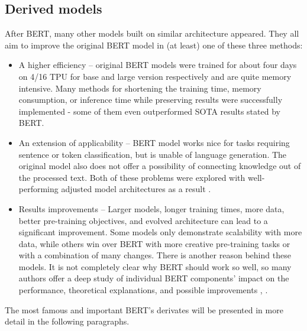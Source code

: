 \subsection{Derived models}
After BERT, many other models built on similar architecture appeared. They all aim to improve the original BERT model in (at least) one of these three methods:
\begin{itemize}
\item A higher efficiency -- original BERT models were trained for about four days on 4/16 TPU for base and large version respectively and are quite memory intensive. Many methods for shortening the training time, memory consumption, or inference time while preserving results were successfully implemented - some of them even outperformed SOTA results stated by BERT.
\item An extension of applicability -- BERT model works nice for tasks requiring sentence or token classification, but is unable of language generation. The original model also does not offer a possibility of connecting knowledge out of the processed text. Both of these problems were explored with well-performing adjusted model architectures as a result \citep{Zhang2019}.
\item Results improvements -- Larger models, longer training times, more data,  better pre-training objectives, and evolved architecture can lead to a significant improvement. Some models only demonstrate scalability with more data, while others win over BERT with more creative pre-training tasks or with a combination of many changes. There is another reason behind these models. It is not completely clear why BERT should work so well, so many authors offer a deep study of individual BERT components' impact on the performance, theoretical explanations, and possible improvements \citep{Yang2019a}, \citep{Liu2019}.
\end{itemize}
 The most famous and important BERT's derivates will be presented in more detail in the following paragraphs.
